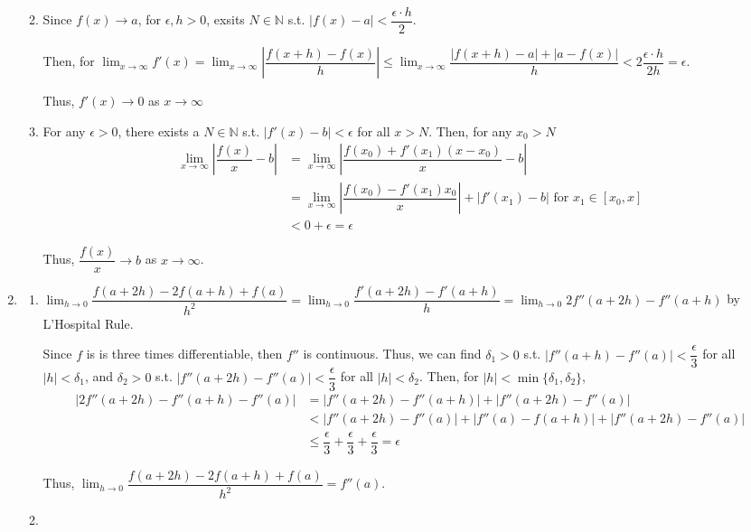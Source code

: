 \documentclass[12pt]{article}
\begin{document}
\begin{enumerate}
\begin{enumerate}
        \newpage
        \item Since $f(x) \to a$, for $\epsilon, h> 0$, exsits $N\in\mathbb{N}$ s.t. $|f(x) - a| < \dfrac{\epsilon \cdot h}{2}$.
        
        Then, for $\displaystyle\lim_{x\to\infty} f'(x) = \displaystyle\lim_{x\to\infty} |\dfrac{f(x + h)-f(x)}{h}| \leq \displaystyle\lim_{x\to\infty} \dfrac{|f(x + h) - a| + |a - f(x)|}{h} < 2\dfrac{\epsilon\cdot h}{2h} = \epsilon$.

        Thus, $f'(x) \to 0$ as $x\to \infty$

        \item For any $\epsilon > 0$, there exists a $N\in\mathbb{N}$ s.t. $|f'(x) - b| < \epsilon$ for all $x > N$.
        Then, for any $x_0 > N$
        \begin{align*}
            \lim_{x\to\infty}|\dfrac{f(x)}{x} - b| &= \lim_{x\to\infty}|\dfrac{f(x_0) + f'(x_1)(x-x_0)}{x} - b|\\
            &=\lim_{x\to\infty} |\dfrac{f(x_0)- f'(x_1)x_0}{x}| + |f'(x_1) - b|\text{ for } x_1\in [x_0, x]\\
            &< 0 + \epsilon = \epsilon
        \end{align*}

        Thus, $\dfrac{f(x)}{x} \to b$ as $x\to\infty$.
    \end{enumerate}

    \item\begin{enumerate}
        \item $\displaystyle\lim_{h\to 0} \dfrac{f(a+2h)-2f(a+h)+f(a)}{h^2} = \displaystyle\lim_{h\to 0} \dfrac{f'(a+2h) - f'(a+h)}{h} = \displaystyle\lim_{h\to 0} 2f''(a+2h) - f''(a + h)$ by L'Hospital Rule.

        Since $f$ is is three times differentiable, then $f''$ is continuous.
        Thus, we can find $\delta_1 > 0$ s.t. $|f''(a+h) - f''(a)| < \dfrac{\epsilon}{3}$ for all $|h| < \delta_1$,
        and $\delta_2 > 0$ s.t. $|f''(a + 2h) - f''(a)| < \dfrac{\epsilon}{3}$ for all $|h| < \delta_2$. 
        Then, for $|h| < \min\{\delta_1, \delta_2\}$, \begin{align*}
            |2f''(a+2h) - f''(a+h) - f''(a)| &= |f''(a+2h) - f''(a+h)| + |f''(a+2h) - f''(a)|\\
            &< |f''(a+2h) - f''(a)| + |f''(a) - f(a + h)| + |f''(a + 2h) - f''(a)|\\
            &\leq \dfrac{\epsilon}{3} + \dfrac{\epsilon}{3} + \dfrac{\epsilon}{3} = \epsilon
        \end{align*}
       
        Thus, $\displaystyle\lim_{h\to 0}\dfrac{f(a + 2h) - 2f(a + h) + f(a)}{h^2} = f''(a)$.

        \item 
    \end{enumerate}
\end{enumerate}
\end{document}

